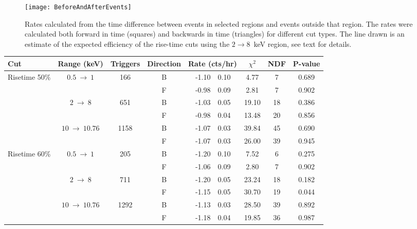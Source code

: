 			\begin{figure}
				\centering
				\texttt{[image: BeforeAndAfterEvents]}
				\caption[Rates calculated from the time difference between events in selected regions]
				{Rates calculated from the time difference between events in selected regions and events outside that region.  The rates were calculated both forward
				in time (squares) and backwards in time (triangles) for different cut types.  The line drawn is an estimate of the 
				expected efficiency of the rise-time cuts using the $2\to8$~keV region, see text for details.}
				\label{fig:BeGeForBack}
			\end{figure}	
			
			\begin{table} \scriptsize
				\centering
				\renewcommand{\arraystretch}{0.68}
				\begin{tabular}{l  c  c  c  r@{$~\pm~$}l  c  c  c } 
				\toprule
					Cut & Range (keV) & Triggers & Direction & \multicolumn{2}{c}{Rate (cts/hr)} & $\chi^2$ & NDF & P-value  \\
				\midrule
				\multirow{6}{*}{Risetime 50\%}& \multirow{2}{*}{$0.5~\to~1$} & \multirow{2}{*}{166}	& B & -1.10 & 0.10 & 4.77 & 7 & 0.689\\
					& & & F & -0.98 & 0.09 & 2.81 & 7 & 0.902\\
				& \multirow{2}{*}{$2~\to~8$} & \multirow{2}{*}{651}	& B & -1.03 & 0.05 & 19.10 & 18 & 0.386\\
					& & & F & -0.98 & 0.04 & 13.48 & 20 & 0.856\\
				& \multirow{2}{*}{$10~\to~10.76$} & \multirow{2}{*}{1158}	& B & -1.07 & 0.03 & 39.84 & 45 & 0.690\\
					& & & F & -1.07 & 0.03 & 26.00 & 39 & 0.945\\
				\midrule
				
				\multirow{6}{*}{Risetime 60\%}& \multirow{2}{*}{$0.5~\to~1$} & \multirow{2}{*}{205}	& B & -1.20 & 0.10 & 7.52 & 6 & 0.275\\
					& & & F & -1.06 & 0.09 & 2.80 & 7 & 0.902\\
				& \multirow{2}{*}{$2~\to~8$} & \multirow{2}{*}{711}	& B & -1.20 & 0.05 & 23.24 & 18 & 0.182\\
					& & & F & -1.15 & 0.05 & 30.70 & 19 & 0.044\\
				& \multirow{2}{*}{$10~\to~10.76$} & \multirow{2}{*}{1292}	& B & -1.13 & 0.03 & 28.50 & 39 & 0.892\\
					& & & F & -1.18 & 0.04 & 19.85 & 36 & 0.987\\
				\midrule
				

\end{tabular}
\end{table}
